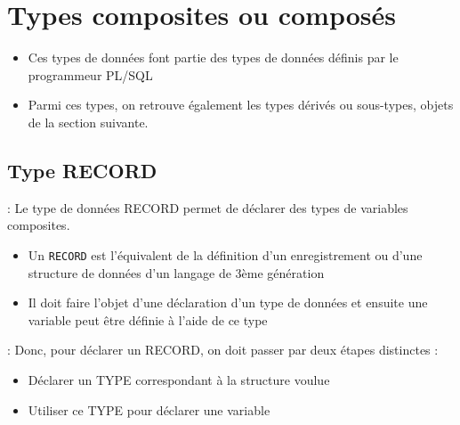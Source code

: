 \documentclass[10pt]{beamer}
\begin{document}
\begin{frame}{\secname}
    
\end{frame}

\begin{frame}{\secname}
    
\end{frame}

\section{Types composites ou composés}
\begin{frame}{\secname}
    \begin{itemize}
        \item Ces types de données font partie des types de données définis par le programmeur PL/SQL
        \item Parmi ces types, on retrouve également les types dérivés ou sous-types, objets de la section suivante.
    \end{itemize}
\end{frame}

\subsection{Type RECORD}
\begin{frame}{\secname : \subsecname}
    Le type de données RECORD permet de déclarer des types de variables composites.
    \begin{itemize}
        \item Un \lstinline[language=plsql]!RECORD! est l'équivalent de la définition d'un enregistrement ou d'une structure de données d'un langage de 3ème génération
        \item Il doit faire l'objet d'une déclaration d'un type de données et ensuite une variable peut être définie à l'aide de ce type
    \end{itemize}
\end{frame}

\begin{frame}{\secname : \subsecname}
    Donc, pour déclarer un RECORD, on doit passer par deux étapes distinctes :
    \begin{itemize}
        \item Déclarer un TYPE correspondant à la structure voulue
        \item Utiliser ce TYPE pour déclarer une variable
    \end{itemize}
\end{frame}
\end{document}
